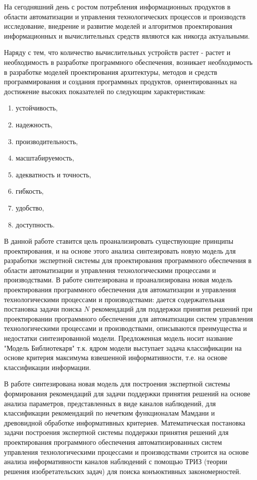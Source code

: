 
{\actuality} 

На сегодняшний день с ростом потребления информационных продуктов в области автоматизации и управления технологических процессов и производств исследование, внедрение и развитие моделей и алгоритмов проектирования информационных и вычислительных средств являются как никогда актуальными.

Наряду с тем, что количество вычислительных устройств растет - растет и необходимость в разработке программного обеспечения, возникает необходимость в разработке моделей проектирования архитектуры, методов и средств программирования и создания программных продуктов, ориентированных на достижение высоких показателей по следующим характеристикам: 
\begin{enumerate}
\item устойчивость, 
\item надежность, 
\item производительность, 
\item масштабируемость, 
\item адекватность и точность, 
\item гибкость, 
\item удобство, 
\item доступность.
\end{enumerate}

В данной работе ставится цель проанализировать существующие принципы проектирования, и на основе этого анализа синтезировать новую модель для разработки экспертной системы для проектирования программного обеспечения в области автоматизации и управления технологическими процессами и производствами. В работе синтезирована и проанализирована новая модель проектирования программного обеспечения для автоматизации и управления технологическими процессами и производствами: дается содержательная постановка задачи поиска $N$ рекомендаций для поддержки принятия решений при проектировании программного обеспечения для автоматизации систем управления технологическими процессами и производствами, описываются преимущества и недостатки синтезированной модели. Предложенная модель носит название "Модель Библиотекаря" т.к. ядром модели выступает задача классификации на основе критерия максимума взвешенной информативности, т.е. на основе классификации информации. 

В работе синтезирована новая модель для построения экспертной системы формирования рекомендаций для задачи поддержки принятия решений на основе анализа параметров, представленных в виде каналов наблюдений, для классификации рекомендаций по нечетким функционалам Мамдани и древовидной обработке информативных критериев. Математическая постановка задачи построения экспертной системы поддержки принятия решений для проектирования программного обеспечения автоматизированных систем управления технологическими процессами и производствами строится на основе анализа информативности каналов наблюдений с помощью ТРИЗ (теории решения изобретательских задач) для поиска конъюктивных закономерностей. 

